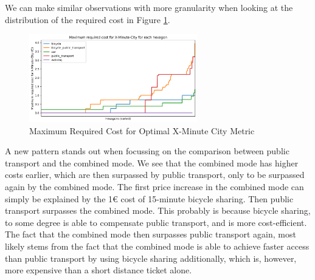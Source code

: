 We can make similar observations with more granularity when looking at the distribution of the required cost in Figure \ref{fig:maximum_required_cost_for_x_minute_city}.
\begin{figure}
  \begin{center}
    \includegraphics[width=0.65\textwidth]{Figures/results/cost/maximum_required_cost_for_x_minute_city}
  \end{center}
  \caption{Maximum Required Cost for Optimal X-Minute City Metric}
  \label{fig:maximum_required_cost_for_x_minute_city}
\end{figure}
A new pattern stands out when focussing on the comparison between public transport and the combined mode.
We see that the combined mode has higher costs earlier, which are then surpassed by public transport, only to be surpassed again by the combined mode.
The first price increase in the combined mode can simply be explained by the 1€ cost of 15-minute bicycle sharing.
Then public transport surpasses the combined mode. 
This probably is because bicycle sharing, to some degree is able to compensate public transport, and is more cost-efficient.
The fact that the combined mode then surpasses public transport again, most likely stems from the fact that the combined mode is able to achieve faster access than public transport by using bicycle sharing additionally, which is, however, more expensive than a short distance ticket alone.


